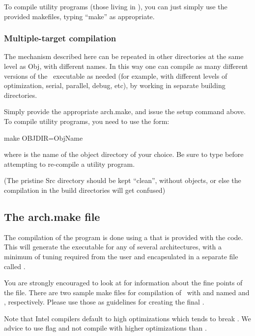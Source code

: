 To compile utility programs (those living in ), you can just
simply use the provided makefiles, typing ``make'' as appropriate.

\subsubsection{Multiple-target compilation}

The mechanism described here can be repeated in other directories at
the same level as Obj, with different names. In this way one can
compile as many different versions of the \siesta\ executable as
needed (for example, with different levels of optimization, serial,
parallel, debug, etc), by working in separate building directories.

Simply provide the appropriate arch.make, and issue the setup command
above. To compile utility programs, you need to use the form:
\begin{shellexample}
   make OBJDIR=ObjName
\end{shellexample}
where  is the name of the object directory of your
choice. Be sure to type  before attempting to
re-compile a utility program.

(The pristine Src directory should be kept ``clean'', without objects, or else
the compilation in the build directories will get confused)


\subsection{The arch.make file}
\label{sec:arch-make}

The compilation of the program is done using a  that is
provided with the code. This  will
generate the executable for any of several architectures, with a
minimum of tuning required from the user and encapsulated in a
separate file called .

You are strongly encouraged to look at
 for information about the
fine points of the  file. There are two sample make
files for compilation of \siesta\ with  and
 named  and
, respectively. Please use those as guidelines
for creating the final .

Note that Intel compilers default to high optimizations which tends to
break \siesta. We advice to use  flag and not
compile with higher optimizations than .

